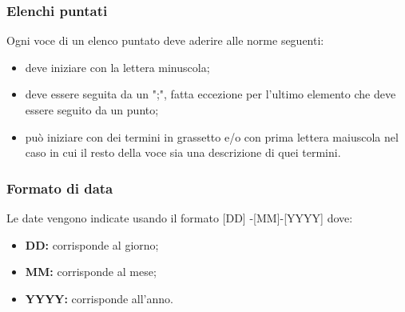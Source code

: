 \subsubsection{Elenchi puntati}
Ogni voce di un elenco puntato deve aderire alle norme seguenti: 
\begin{itemize}
	\item deve iniziare con la lettera minuscola;
	\item deve essere seguita da un ";", fatta eccezione per l’ultimo elemento che deve essere seguito da un punto; 
	\item può iniziare con dei termini in grassetto e/o con prima lettera maiuscola nel caso in cui il resto della voce sia una descrizione di quei termini.
\end{itemize}
\subsubsection{Formato di data}
Le date vengono indicate usando il formato
[DD] -[MM]-[YYYY] dove:
\\
\begin{itemize}
\item \textbf{DD:} corrisponde al giorno;
	\item \textbf{MM:} corrisponde al mese;
		\item \textbf{YYYY:} corrisponde all'anno.
\end{itemize}
